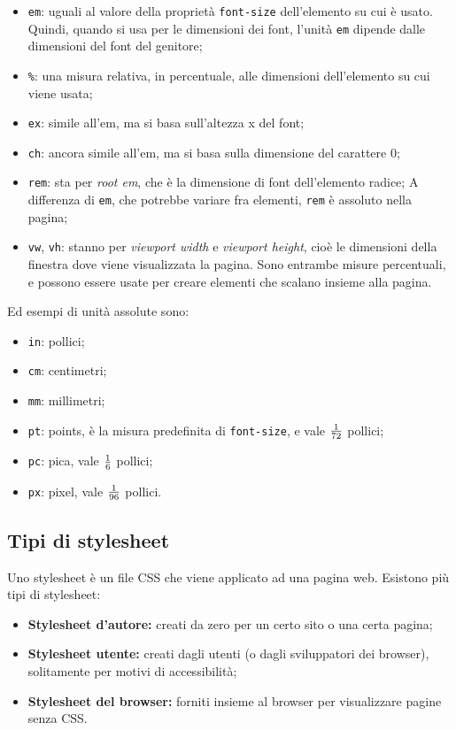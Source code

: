 \documentclass[a4paper,11pt]{article}
\begin{document}
\begin{itemize}
	\item \lstinline|em|: uguali al valore della proprietà \lstinline|font-size| dell'elemento su cui è usato.
		Quindi, quando si usa per le dimensioni dei font, l'unità \lstinline|em| dipende dalle dimensioni del font del genitore;
	\item \lstinline|%|: una misura relativa, in percentuale, alle dimensioni dell'elemento su cui viene usata;
	\item \lstinline|ex|: simile all'em, ma si basa sull'altezza x del font;
	\item \lstinline|ch|: ancora simile all'em, ma si basa sulla dimensione del carattere 0;
	\item \lstinline|rem|: sta per \textit{root em}, che è la dimensione di font dell'elemento radice;
		A differenza di \lstinline|em|, che potrebbe variare fra elementi, \lstinline|rem| è assoluto nella pagina;
	\item \lstinline|vw|, \lstinline|vh|: stanno per \textit{viewport width} e \textit{viewport height}, cioè le dimensioni della finestra dove viene visualizzata la pagina.
		Sono entrambe misure percentuali, e possono essere usate per creare elementi che scalano insieme alla pagina.
\end{itemize}

Ed esempi di unità assolute sono:

\begin{itemize}
	\item \lstinline|in|: pollici;
	\item \lstinline|cm|: centimetri;
	\item \lstinline|mm|: millimetri;
	\item \lstinline|pt|: points, è la misura predefinita di \lstinline|font-size|, e vale $1 \over 72$ pollici;
	\item \lstinline|pc|: pica, vale $1 \over 6$ pollici;
	\item \lstinline|px|: pixel, vale $1 \over 96$ pollici.
\end{itemize}

\subsection{Tipi di stylesheet}
Uno stylesheet è un file CSS che viene applicato ad una pagina web.
Esistono più tipi di stylesheet:
\begin{itemize}
	\item \textbf{Stylesheet d'autore:} creati da zero per un certo sito o una certa pagina; 
	\item \textbf{Stylesheet utente:} creati dagli utenti (o dagli sviluppatori dei browser), solitamente per motivi di accessibilità;
	\item \textbf{Stylesheet del browser:} forniti insieme al browser per visualizzare pagine senza CSS.
\end{itemize}
\end{document}
